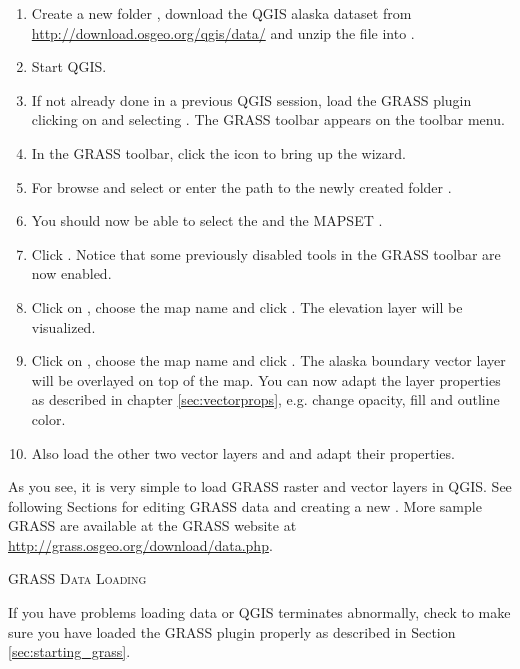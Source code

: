 \begin{enumerate}
  \item Create a new folder , download the QGIS alaska
  dataset  from
  \url{http://download.osgeo.org/qgis/data/} and unzip the file into
  .
  \item Start QGIS.
  \item If not already done in a previous QGIS session, load the GRASS plugin
  clicking on  \arrow {} and
  selecting . The GRASS toolbar appears on the toolbar menu.
  \item In the GRASS toolbar, click the  icon to bring up the  wizard.
  \item For  browse and select or enter the path to the
  newly created folder .
  \item You should now be able to select the 
  and the MAPSET .
  \item Click . Notice that some previously disabled tools in the
  GRASS toolbar are now enabled.
  \item Click on ,
  choose the map name  and click . The elevation
  layer will be visualized.
  \item Click on ,
  choose the map name  and click . The alaska
  boundary vector layer will be overlayed on top of the  map. You can
  now adapt the layer properties as described in chapter \ref{sec:vectorprops},
  e.g. change opacity, fill and outline color.
  \item Also load the other two vector layers  and
   and adapt their properties.
\end{enumerate}

As you see, it is very simple to load GRASS raster and vector layers in QGIS.
See following Sections for editing GRASS data and creating a new
. More sample GRASS  are available at
the GRASS website at \url{http://grass.osgeo.org/download/data.php}.

\begin{Tip}\caption{\textsc{GRASS Data Loading}}
If you have problems loading data or QGIS terminates abnormally,
check to make sure you have loaded the GRASS plugin properly as described in
Section \ref{sec:starting_grass}.
\end{Tip}

